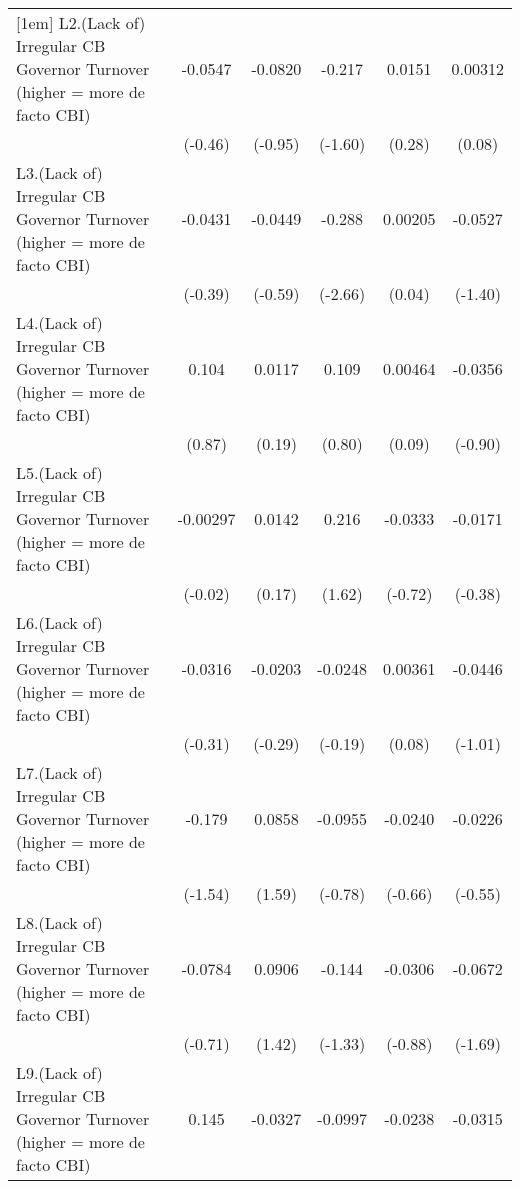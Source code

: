 {\begin{tabular}{l*{5}{c}}
[1em]
L2.(Lack of) Irregular CB Governor Turnover (higher = more de facto CBI)&  -0.0547         &  -0.0820         &   -0.217         &   0.0151         &  0.00312         \\
                &  (-0.46)         &  (-0.95)         &  (-1.60)         &   (0.28)         &   (0.08)         \\
[1em]
L3.(Lack of) Irregular CB Governor Turnover (higher = more de facto CBI)&  -0.0431         &  -0.0449         &   -0.288\sym{**} &  0.00205         &  -0.0527         \\
                &  (-0.39)         &  (-0.59)         &  (-2.66)         &   (0.04)         &  (-1.40)         \\
[1em]
L4.(Lack of) Irregular CB Governor Turnover (higher = more de facto CBI)&    0.104         &   0.0117         &    0.109         &  0.00464         &  -0.0356         \\
                &   (0.87)         &   (0.19)         &   (0.80)         &   (0.09)         &  (-0.90)         \\
[1em]
L5.(Lack of) Irregular CB Governor Turnover (higher = more de facto CBI)& -0.00297         &   0.0142         &    0.216         &  -0.0333         &  -0.0171         \\
                &  (-0.02)         &   (0.17)         &   (1.62)         &  (-0.72)         &  (-0.38)         \\
[1em]
L6.(Lack of) Irregular CB Governor Turnover (higher = more de facto CBI)&  -0.0316         &  -0.0203         &  -0.0248         &  0.00361         &  -0.0446         \\
                &  (-0.31)         &  (-0.29)         &  (-0.19)         &   (0.08)         &  (-1.01)         \\
[1em]
L7.(Lack of) Irregular CB Governor Turnover (higher = more de facto CBI)&   -0.179         &   0.0858         &  -0.0955         &  -0.0240         &  -0.0226         \\
                &  (-1.54)         &   (1.59)         &  (-0.78)         &  (-0.66)         &  (-0.55)         \\
[1em]
L8.(Lack of) Irregular CB Governor Turnover (higher = more de facto CBI)&  -0.0784         &   0.0906         &   -0.144         &  -0.0306         &  -0.0672         \\
                &  (-0.71)         &   (1.42)         &  (-1.33)         &  (-0.88)         &  (-1.69)         \\
[1em]
L9.(Lack of) Irregular CB Governor Turnover (higher = more de facto CBI)&    0.145         &  -0.0327         &  -0.0997         &  -0.0238         &  -0.0315         \\

\end{tabular}}
